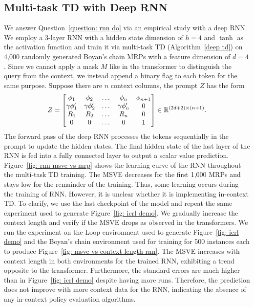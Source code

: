 \documentclass{article}
\newcommand{\R}{\mathbb{R}}
\begin{document}
\subsection{Multi-task TD with Deep RNN}
We answer Question~\ref{question: rnn do} via an empirical study with a deep RNN.
We employ a 3-layer RNN with a hidden state dimension of $h=4$ and $\tanh$ as the activation function and train it via multi-task TD (Algorithm~\ref{deep td}) on 4,000 randomly generated Boyan's chain MRPs with a feature dimension of $d=4$.
Since we cannot apply a mask $M$ like in the transformer to distinguish the query from the context, we instead append a binary flag to each token for the same purpose.
Suppose there are $n$ context columns, the prompt $Z$ has the form
\begin{align}
    Z = \mqty[\phi_1 & \phi_2 & \dots & \phi_n & \phi_{n+1}\\
              \gamma\phi'_1 & \gamma\phi'_2 & \dots &\gamma\phi'_n & 0\\
              R_1 & R_2 & \dots & R_n & 0\\
              0 & 0 & \dots & 0 & 1
              ] \in \R^{(2d + 2) \times (n+1)}.
\end{align}
The forward pass of the deep RNN processes the tokens sequentially in the prompt to update the hidden states.
The final hidden state of the last layer of the RNN is fed into a fully connected layer to output a scalar value prediction.
Figure~\ref{fig: rnn msve vs mrp} shows the learning curve of the RNN throughout the multi-task TD training.
The MSVE decreases for the first 1,000 MRPs and stays low for the remainder of the training.
Thus, some learning occurs during the training of RNN.
However, it is unclear whether it is implementing in-context TD.
To clarify, we use the last checkpoint of the model and repeat the same experiment used to generate Figure~\ref{fig: icrl demo}.
We gradually increase the context length and verify if the MSVE drops as observed in the transformers.
We run the experiment on the Loop environment used to generate Figure~\ref{fig: icrl demo} and the Boyan's chain environment used for training for 500 instances each to produce Figure~\ref{fig: msve vs context length rnn}.
The MSVE increases with context length in both environments for the trained RNN, exhibiting a trend opposite to the transformer.
Furthermore, the standard errors are much higher than in Figure~\ref{fig: icrl demo} despite having more runs.
Therefore, the prediction does not improve with more context data for the RNN, indicating the absence of any in-context policy evaluation algorithms.
\end{document}
